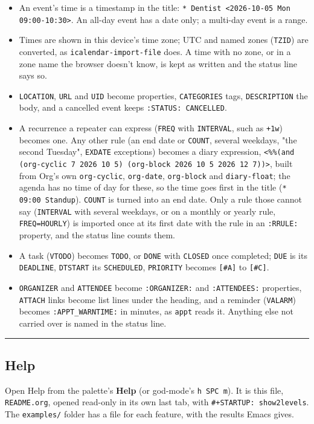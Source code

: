\documentclass[11pt]{article}
\begin{document}
\begin{itemize}
\item An event's time is a timestamp in the title: \texttt{* Dentist <2026-10-05 Mon 09:00-10:30>}. An all-day event has a date only; a multi-day event is a range.
\item Times are shown in this device's time zone; UTC and named zones (\texttt{TZID}) are converted, as \texttt{icalendar-import-file} does. A time with no zone, or in a zone name the browser doesn't know, is kept as written and the status line says so.
\item \texttt{LOCATION}, \texttt{URL} and \texttt{UID} become properties, \texttt{CATEGORIES} tags, \texttt{DESCRIPTION} the body, and a cancelled event keeps \texttt{:STATUS: CANCELLED}.
\item A recurrence a repeater can express (\texttt{FREQ} with \texttt{INTERVAL}, such as \texttt{+1w}) becomes one. Any other rule (an end date or \texttt{COUNT}, several weekdays, "the second Tuesday", \texttt{EXDATE} exceptions) becomes a diary expression, \texttt{<\%\%(and (org-cyclic 7 2026 10 5) (org-block 2026 10 5 2026 12 7))>}, built from Org's own \texttt{org-cyclic}, \texttt{org-date}, \texttt{org-block} and \texttt{diary-float}; the agenda has no time of day for these, so the time goes first in the title (\texttt{* 09:00 Standup}). \texttt{COUNT} is turned into an end date. Only a rule those cannot say (\texttt{INTERVAL} with several weekdays, or on a monthly or yearly rule, \texttt{FREQ=HOURLY}) is imported once at its first date with the rule in an \texttt{:RRULE:} property, and the status line counts them.
\item A task (\texttt{VTODO}) becomes \texttt{TODO}, or \texttt{DONE} with \texttt{CLOSED} once completed; \texttt{DUE} is its \texttt{DEADLINE}, \texttt{DTSTART} its \texttt{SCHEDULED}, \texttt{PRIORITY} becomes \texttt{[\#A]} to \texttt{[\#C]}.
\item \texttt{ORGANIZER} and \texttt{ATTENDEE} become \texttt{:ORGANIZER:} and \texttt{:ATTENDEES:} properties, \texttt{ATTACH} links become list lines under the heading, and a reminder (\texttt{VALARM}) becomes \texttt{:APPT\_WARNTIME:} in minutes, as \texttt{appt} reads it. Anything else not carried over is named in the status line.
\end{itemize}

\noindent\rule{\textwidth}{0.5pt}

\subsection{Help}
\label{sec:org65b75d7}
Open Help from the palette's \textbf{Help} (or god-mode's \texttt{h SPC m}). It is this file, \texttt{README.org}, opened read-only in its own last tab, with \texttt{\#+STARTUP: show2levels}. The \texttt{examples/} folder has a file for each feature, with the results Emacs gives.
\end{document}
